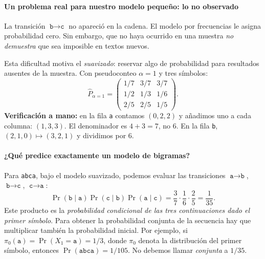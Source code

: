 \paragraph{Un problema real para nuestro modelo pequeño: lo no observado}
La transición $\texttt{b}\to\texttt{c}$ no apareció en la cadena. El modelo por frecuencias le asigna probabilidad cero. Sin embargo, que no haya ocurrido en una muestra \emph{no demuestra} que sea imposible en textos nuevos.
\begin{center}
\end{center}
Esta dificultad motiva el \emph{suavizado}: reservar algo de probabilidad para resultados ausentes de la muestra. Con pseudoconteo $\alpha=1$ y tres símbolos:
\[
\widehat P_{\alpha=1}=\begin{pmatrix}1/7&3/7&3/7\\1/2&1/3&1/6\\2/5&2/5&1/5\end{pmatrix}.
\]
\textbf{Verificación a mano:} en la fila \texttt{a} contamos $(0,2,2)$ y añadimos uno a cada columna: $(1,3,3)$. El denominador es $4+3=7$, no $6$. En la fila \texttt{b}, $(2,1,0)\mapsto(3,2,1)$ y dividimos por $6$.

\paragraph{¿Qué predice exactamente un modelo de bigramas?}
Para \texttt{abca}, bajo el modelo suavizado, podemos evaluar las transiciones $\texttt{a}\to\texttt{b}$, $\texttt{b}\to\texttt{c}$, $\texttt{c}\to\texttt{a}$:
\[
\Pr(\texttt{b}\mid\texttt{a})\Pr(\texttt{c}\mid\texttt{b})\Pr(\texttt{a}\mid\texttt{c})=\frac37\cdot\frac16\cdot\frac25=\frac1{35}.
\]
Este producto es la \emph{probabilidad condicional de las tres continuaciones dado el primer símbolo}. Para obtener la probabilidad conjunta de la secuencia hay que multiplicar también la probabilidad inicial. Por ejemplo, si $\pi_0(\texttt{a})=\Pr(X_1=\texttt{a})=1/3$, donde $\pi_0$ denota la distribución del primer símbolo, entonces $\Pr(\texttt{abca})=1/105$. No debemos llamar \emph{conjunta} a $1/35$.

